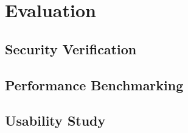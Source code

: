 %
%
%

\chapter{Evaluation}

\section{Security Verification}

\section{Performance Benchmarking}

\section{Usability Study}
